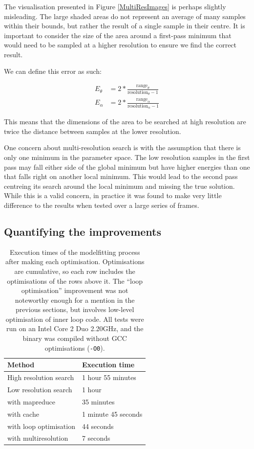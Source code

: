 The visualisation presented in Figure \ref{MultiResImages} is perhaps slightly misleading.
The large shaded areas do not represent an average of many samples within their bounds, but rather the result of a single sample in their centre.
It is important to consider the size of the area around a first-pass minimum that would need to be sampled at a higher resolution to ensure we find the correct result.

We can define this error as such:

\begin{align}
	E_\theta &= 2 * \frac{\text{range}_\theta}{\text{resolution}_\theta - 1} \\
	E_\alpha &= 2 * \frac{\text{range}_\alpha}{\text{resolution}_\alpha - 1}
\end{align}

This means that the dimensions of the area to be searched at high resolution are twice the distance between samples at the lower resolution.

One concern about multi-resolution search is with the assumption that there is only one minimum in the parameter space.
The low resolution samples in the first pass may fall either side of the global minimum but have higher energies than one that falls right on another local minimum.
This would lead to the second pass centreing its search around the local minimum and missing the true solution.
While this is a valid concern, in practice it was found to make very little difference to the results when tested over a large series of frames.

\subsection{Quantifying the improvements}

\begin{table}[thb]
	\centering
	\begin{tabular}{l|l}
		\hline
		Method & Execution time \\
		\hline
		High resolution search & 1 hour 55 minutes \\
		Low resolution search & 1 hour \\
		with mapreduce & 35 minutes \\
		with cache & 1 minute 45 seconds \\
		with loop optimisation & 44 seconds \\
		with multiresolution & 7 seconds \\
		\hline
	\end{tabular}
	\caption{Execution times of the modelfitting process after making each optimisation.
		Optimisations are cumulative, so each row includes the optimisations of the rows above it.
		The ``loop optimisation'' improvement was not noteworthy enough for a mention in the previous sections,
		but involves low-level optimisation of inner loop code.
		All tests were run on an Intel Core 2 Duo 2.20GHz, and the binary was compiled without GCC optimisations (\texttt{-O0}).}
	\label{QuantifyingOptimisations}
\end{table}

